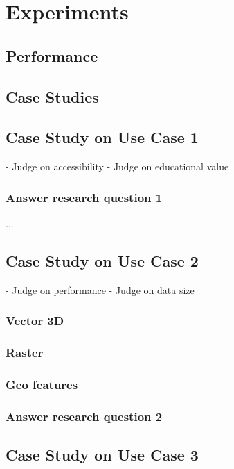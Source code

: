 \chapter{Experiments}%

\section{ Performance }

\section{ Case Studies } 



\section{Case Study on Use Case 1}%
- Judge on accessibility
- Judge on educational value

\subsection*{Answer research question 1}

...

\section{Case Study on Use Case 2}%
- Judge on performance
- Judge on data size


\subsection{Vector 3D}

\subsection{Raster}

\subsection{Geo features}

\subsection*{Answer research question 2}

\section{Case Study on Use Case 3}%

